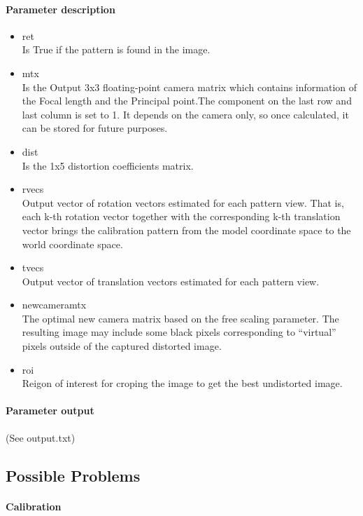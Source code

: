 \documentclass{scrartcl}
\begin{document}
\paragraph{Parameter description}
\begin{itemize}
\item ret\\
Is True if the pattern is found in the image.

\item mtx\\
Is the Output 3x3 floating-point camera matrix which contains information of the Focal length and the Principal point.The component on the last row and last column is set to 1.
It depends on the camera only, so once calculated, it can be stored for future purposes.
\item dist\\
Is the 1x5 distortion coefficients matrix.
\item rvecs\\
Output vector of rotation vectors estimated for each pattern view. That is, each k-th rotation vector together with the corresponding k-th translation vector brings the calibration pattern from the model coordinate space to the world coordinate space.
\item tvecs\\
Output vector of translation vectors estimated for each pattern view.
\item newcameramtx\\
The optimal new camera matrix based on the free scaling parameter. The resulting image may include some black pixels corresponding to “virtual” pixels outside of the captured distorted image.
\item roi\\
Reigon of interest for croping the image to get the best undistorted image.
\end{itemize}

\paragraph{Parameter output}
(See output.txt)


\subsection{Possible Problems}
\paragraph{Calibration}
\end{document}
